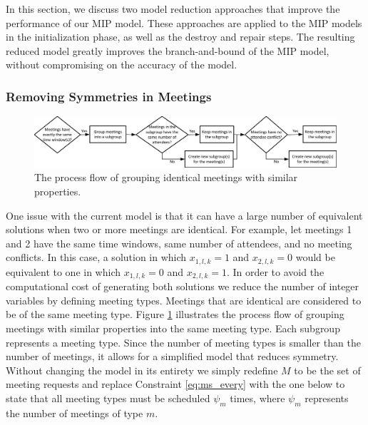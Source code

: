 In this section, we discuss two model reduction approaches that improve the performance of our MIP model. These approaches are applied to the MIP models in the initialization phase, as well as the destroy and repair steps. The resulting reduced model greatly improves the branch-and-bound of the MIP model, without compromising on the accuracy of the model.


\subsubsection{Removing Symmetries in Meetings}

\begin{figure}
	\centering
		\includegraphics[width=1\linewidth]{figs/lns_mtype.jpg}
	\caption{The process flow of grouping identical meetings with similar properties.}
	\label{fig:mtype}
\end{figure}

One issue with the current model is that it can have a large number of equivalent solutions when two or more meetings are identical. For example, let meetings 1 and 2 have the same time windows, same number of attendees, and no meeting conflicts. In this case, a solution in which $x_{1,l,k} = 1$ and $x_{2,l,k} = 0$ would be equivalent to one in which $x_{1,l,k} = 0$ and $x_{2,l,k} = 1$. In order to avoid the computational cost of generating both solutions we reduce the number of integer variables by defining meeting types. Meetings that are identical are considered to be of the same meeting type. Figure \ref{fig:mtype} illustrates the process flow of grouping meetings with similar properties into the same meeting type. Each subgroup represents a meeting type. Since the number of meeting types is smaller than the number of meetings, it allows for a simplified model that reduces symmetry. Without changing the model in its entirety we simply redefine $M$ to be the set of meeting requests and replace Constraint \eqref{eq:ms_every} with the one below to state that all meeting types must be scheduled $\psi_m$ times, where $\psi_m$ represents the number of meetings of type $m$.

